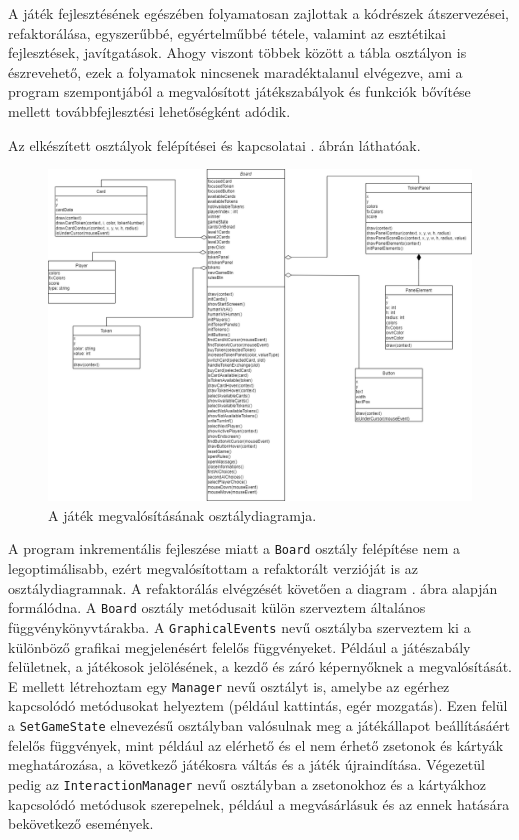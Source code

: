 
A játék fejlesztésének egészében folyamatosan zajlottak a kódrészek átszervezései, refaktorálása, egyszerűbbé, egyértelműbbé tétele, valamint az esztétikai fejlesztések, javítgatások. Ahogy viszont többek között a tábla osztályon is észrevehető, ezek a folyamatok nincsenek maradéktalanul elvégezve, ami a program szempontjából a megvalósított játékszabályok és funkciók bővítése mellett továbbfejlesztési lehetőségként adódik.


Az elkészített osztályok felépítései és kapcsolatai . ábrán láthatóak.

\begin{figure}[h]
\centering
\includegraphics[scale=0.35]{images/UML.png}
\caption{A játék megvalósításának osztálydiagramja.}
\label{fig:uml}
\end{figure}

A program inkrementális fejleszése miatt a \texttt{Board} osztály felépítése nem a legoptimálisabb, ezért megvalósítottam a refaktorált verzióját is az osztálydiagramnak. A refaktorálás elvégzését követően a diagram . ábra alapján formálódna. A \texttt{Board} osztály metódusait külön szerveztem általános függvénykönyvtárakba. A \texttt{GraphicalEvents} nevű osztályba szerveztem ki a különböző grafikai megjelenésért felelős függvényeket. Például a játészabály felületnek, a játékosok jelölésének, a kezdő és záró képernyőknek a megvalósítását. E mellett létrehoztam egy \texttt{Manager} nevű osztályt is, amelybe az egérhez kapcsolódó metódusokat helyeztem (például kattintás, egér mozgatás). Ezen felül a \texttt{SetGameState} elnevezésű osztályban valósulnak meg a játékállapot beállításáért felelős függvények, mint például az elérhető és el nem érhető zsetonok és kártyák meghatározása, a következő játékosra váltás és a játék újraindítása. Végezetül pedig az \texttt{InteractionManager} nevű osztályban a zsetonokhoz és a kártyákhoz kapcsolódó metódusok szerepelnek, például a megvásárlásuk és az ennek hatására bekövetkező események.

